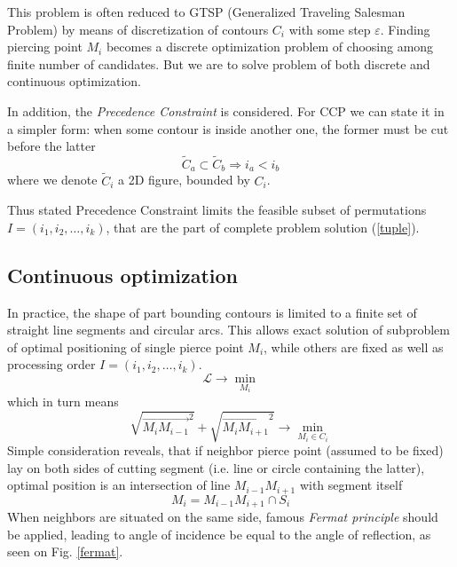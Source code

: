 \documentclass{ifacconf}
\begin{document}
This problem is often
reduced to GTSP
(Generalized Traveling Salesman Problem)
by means of
discretization of contours $C_i$
with some step $\varepsilon$.
Finding piercing point $M_i$
becomes a discrete optimization problem
of choosing among finite number of
candidates.
But we are to solve
problem of both discrete and
continuous optimization.

In addition,
the \textit{Precedence Constraint}
is considered.
For CCP we can state it in a simpler form:
when some contour is inside another one,
the former must be cut
before the latter
$$
\tilde C_a \subset \tilde C_b
\Rightarrow
i_a < i_b
$$
where we denote
$\tilde C_i$ a 2D figure,
bounded by $C_i$.

Thus stated Precedence Constraint
limits the feasible subset of permutations
$I=(i_1, i_2, \dots, i_k)$,
that are the part of
complete problem solution (\ref{tuple}).

\subsection{Continuous optimization}
In practice,
the shape of part bounding contours
is limited to a finite set
of straight line segments and circular arcs.
This allows exact solution of
subproblem of optimal
positioning of single pierce point $M_i$,
while others are fixed as well as
processing order
$I=(i_1, i_2, \dots, i_k)$.
$$
\mathcal L \to \min_{M_i}
$$
which in turn means
$$
\sqrt{\overrightarrow{M_i M_{i-1}}^2} +
\sqrt{\overrightarrow{M_i M_{i+1}}^2} \to
\min_{M_i \in C_i}
$$
Simple consideration reveals,
that
if neighbor pierce
point (assumed to be fixed)
lay on both sides of cutting segment
(i.e. line or circle containing the latter),
optimal position is an
intersection of line $M_{i-1}M_{i+1}$
with segment itself
$$
M_i = M_{i-1}M_{i+1} \cap S_i
$$
When neighbors are situated
on the same side,
famous \textit{Fermat principle}
should be applied,
leading to
angle of incidence be equal to the angle of reflection,
as seen on Fig. \ref{fermat}.
\end{document}
